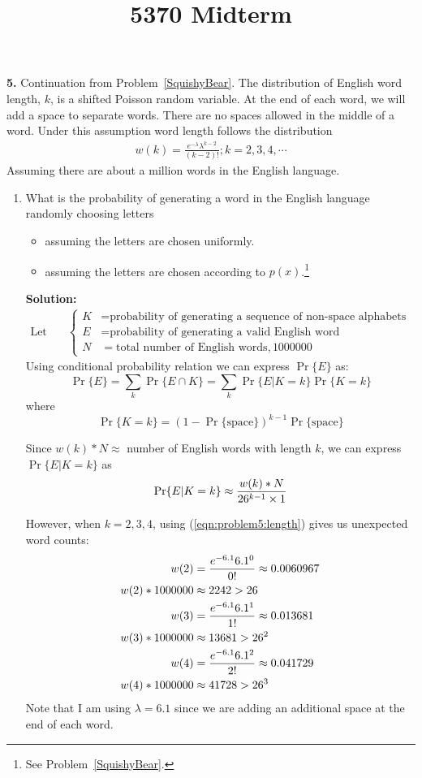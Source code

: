 \documentclass{assignment}
\begin{document}
\title{5370 Midterm}


\textbf{5.} \label{NewToyYoda}
Continuation from Problem~\ref{SquishyBear}.
The distribution of English word length, $k$, is a shifted Poisson random variable. At the end of each word, we will add
a space to separate words. There are no spaces allowed in the middle of a word. Under this assumption word length
follows the distribution
\begin{align}
  w(k)=\frac{e^{-\lambda}\lambda^{k-2} }{(k-2)!} ; k=2,3,4,\cdots \label{eqn:problem5:length}
\end{align}
$$ $$
Assuming there are about a million words in the English language.
\begin{enumerate}
\item What is the probability of generating a word in the English language randomly choosing letters
  \begin{itemize}
  \item assuming the letters are chosen uniformly.
  \item assuming the letters are chosen according to $p(x)$.\footnote{See Problem~\ref{SquishyBear}.}
  \end{itemize}
  \textbf{Solution:} \\
  \begin{align*}
    \text{Let} \quad & \begin{cases}
      K & = \text{probability of generating a sequence of non-space alphabets followed by a space
      character} \\
      E & = \text{probability of generating a valid English word} \\
      N & = \text{total number of English words}, 1000000
    \end{cases}
  \end{align*}
  Using conditional probability relation we can express $\Pr\{E\}$ as:
  $$\Pr\{E\}= \sum_k \Pr\{E \cap K\} = \sum_k \Pr\{E|K=k\}\Pr\{K=k\}$$
  where
  $$\Pr\{K=k\} = (1 - \Pr\{\text{space}\})^{k-1}\Pr\{\text{space}\}$$

  Since $w(k) * N \approx $ number of English words with length $k$, we can express $\Pr\{E|K=k\}$ as
  $$\Pr\{E|K=k\} \approx \dfrac{w(k) * N}{26^{k-1}\times 1}$$

  However, when $k=2,3,4$, using (\ref{eqn:problem5:length}) gives us unexpected word counts:
  \begin{align*}
    w(2) & = \dfrac{e^{-6.1}6.1^0}{0!} \approx 0.0060967 \\
    w(2) * 1000000 &  \approx 2242 > 26 \\
    w(3) & = \dfrac{e^{-6.1}6.1^1}{1!} \approx 0.013681 \\
    w(3) * 1000000 & \approx 13681 > 26^2 \\
    w(4) & = \dfrac{e^{-6.1}6.1^2}{2!} \approx 0.041729 \\
    w(4) * 1000000 & \approx 41728 > 26^3
  \end{align*}
  Note that I am using $\lambda = 6.1$ since we are adding an additional space at the end of each word.



\end{enumerate}
\end{document}
